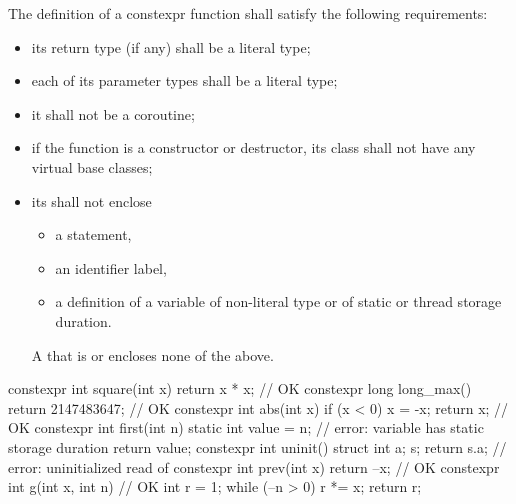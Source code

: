 \pnum
{}%
%
The definition of a constexpr function shall satisfy the following
requirements:
\begin{itemize}
\item
its return type (if any) shall be a literal type;

\item
each of its parameter types shall be a literal type;

\item
it shall not be a coroutine;

\item
if the function is a constructor or destructor,
its class shall not have any virtual base classes;

\item
its  shall not enclose
\begin{itemize}
\item a  statement,
\item an identifier label,
\item a definition of a variable
of non-literal type or
of static or thread storage duration.
\end{itemize}
\begin{note}
A  that is  or 
encloses none of the above.
\end{note}
\end{itemize}

\begin{example}
\begin{codeblock}
constexpr int square(int x)
  { return x * x; }             // OK
constexpr long long_max()
  { return 2147483647; }        // OK
constexpr int abs(int x) {
  if (x < 0)
    x = -x;
  return x;                     // OK
}
constexpr int first(int n) {
  static int value = n;         // error: variable has static storage duration
  return value;
}
constexpr int uninit() {
  struct { int a; } s;
  return s.a;                   // error: uninitialized read of 
}
constexpr int prev(int x)
  { return --x; }               // OK
constexpr int g(int x, int n) { // OK
  int r = 1;
  while (--n > 0) r *= x;
  return r;
}
\end{codeblock}
\end{example}

